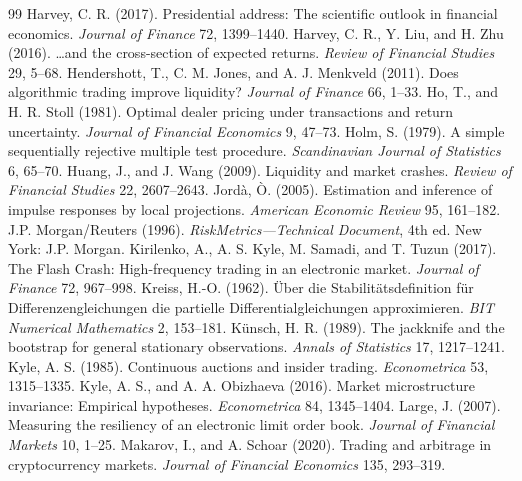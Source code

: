 \documentclass[12pt]{article}
\theoremstyle{definition}
\theoremstyle{remark}
\begin{document}
\begin{thebibliography}{99}
 Harvey, C. R. (2017). Presidential address: The scientific outlook in financial economics. \emph{Journal of Finance} 72, 1399--1440.
 Harvey, C. R., Y. Liu, and H. Zhu (2016). \ldots and the cross-section of expected returns. \emph{Review of Financial Studies} 29, 5--68.
 Hendershott, T., C. M. Jones, and A. J. Menkveld (2011). Does algorithmic trading improve liquidity? \emph{Journal of Finance} 66, 1--33.
 Ho, T., and H. R. Stoll (1981). Optimal dealer pricing under transactions and return uncertainty. \emph{Journal of Financial Economics} 9, 47--73.
 Holm, S. (1979). A simple sequentially rejective multiple test procedure. \emph{Scandinavian Journal of Statistics} 6, 65--70.
 Huang, J., and J. Wang (2009). Liquidity and market crashes. \emph{Review of Financial Studies} 22, 2607--2643.
 Jord\`a, \`O. (2005). Estimation and inference of impulse responses by local projections. \emph{American Economic Review} 95, 161--182.
 J.P. Morgan/Reuters (1996). \emph{RiskMetrics---Technical Document}, 4th ed. New York: J.P. Morgan.
 Kirilenko, A., A. S. Kyle, M. Samadi, and T. Tuzun (2017). The Flash Crash: High-frequency trading in an electronic market. \emph{Journal of Finance} 72, 967--998.
 Kreiss, H.-O. (1962). \"Uber die Stabilit\"atsdefinition f\"ur Differenzengleichungen die partielle Differentialgleichungen approximieren. \emph{BIT Numerical Mathematics} 2, 153--181.
 K\"unsch, H. R. (1989). The jackknife and the bootstrap for general stationary observations. \emph{Annals of Statistics} 17, 1217--1241.
 Kyle, A. S. (1985). Continuous auctions and insider trading. \emph{Econometrica} 53, 1315--1335.
 Kyle, A. S., and A. A. Obizhaeva (2016). Market microstructure invariance: Empirical hypotheses. \emph{Econometrica} 84, 1345--1404.
 Large, J. (2007). Measuring the resiliency of an electronic limit order book. \emph{Journal of Financial Markets} 10, 1--25.
 Makarov, I., and A. Schoar (2020). Trading and arbitrage in cryptocurrency markets. \emph{Journal of Financial Economics} 135, 293--319.

\end{thebibliography}
\end{document}
